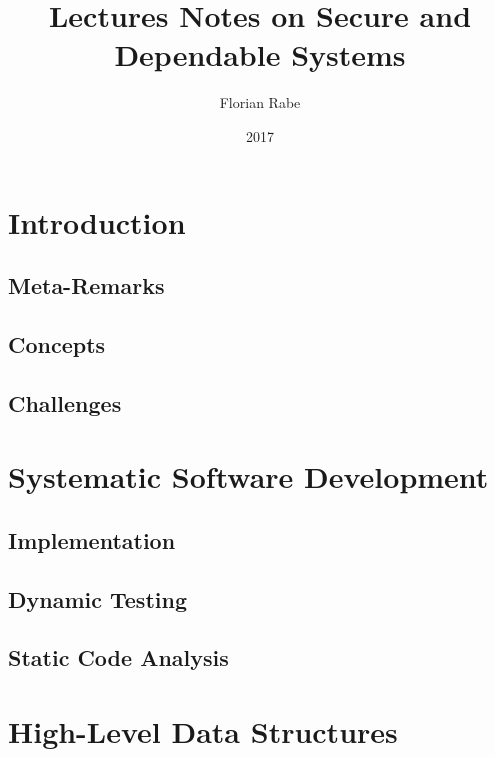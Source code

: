 \documentclass{book}
\title{Lectures Notes on Secure and Dependable Systems}
\author{Florian Rabe}
\date{2017}
\begin{document}
\maketitle

\tableofcontents
\newpage

\part{Introduction}

 \chapter{Meta-Remarks}
  

  \chapter{Concepts}
   

 \chapter{Challenges}
   

\part{Systematic Software Development}

  \chapter{Implementation}
    

  \chapter{Dynamic Testing}
    

  \chapter{Static Code Analysis}
    
    

\part{High-Level Data Structures}
\end{document}
